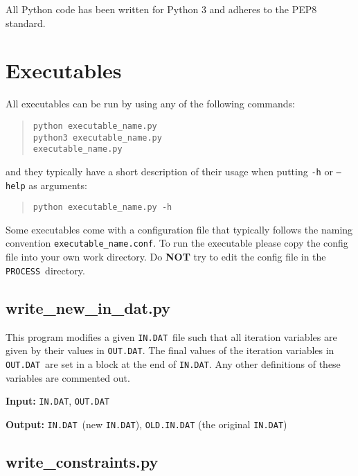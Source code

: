 \documentclass[11pt,a4paper]{report}
\newcommand{\indat}{\mbox{\texttt{IN.DAT}}}
\newcommand{\outdat}{\mbox{\texttt{OUT.DAT}}}
\newcommand{\process}{\mbox{\texttt{PROCESS}}}
\begin{document}
All Python code has been written for Python 3 and adheres to the PEP8 standard.

\section{Executables}
\label{sec:py_exec}

All executables can be run by using any of the following commands:
\begin{quote}
\begin{verbatim}
python executable_name.py
python3 executable_name.py
executable_name.py
\end{verbatim}
\end{quote}
and they typically have a short description of their usage when putting
\texttt{-h} or \texttt{--help} as arguments:
\begin{quote}
\begin{verbatim}
python executable_name.py -h
\end{verbatim}
\end{quote}

Some executables come with a configuration file that typically follows the
naming convention \texttt{executable\_name.conf}. To run the executable please
copy the config file into your own work directory. Do \textbf{NOT} try to edit
the config file in the \process\ directory.

\subsection{write\_new\_in\_dat.py}

This program modifies a given \indat\ file such that all iteration variables
are given by their values in \outdat. The final values of the iteration
variables in \outdat\ are set in a block at the end of \indat. Any other
definitions of these variables are commented out.

\begin{description}
\item{\textbf{Input:}}
\indat, \outdat\ 
                                
\item{\textbf{Output:}}
\indat\ (new \indat), \texttt{OLD.IN.DAT} (the original \indat)
\end{description}

\subsection{write\_constraints.py}
\end{document}
